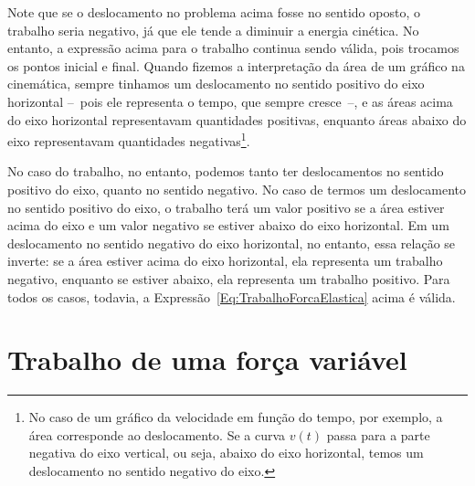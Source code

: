 Note que se o deslocamento no problema acima fosse no sentido oposto, o trabalho seria negativo, já que ele tende a diminuir a energia cinética. No entanto, a expressão acima para o trabalho continua sendo válida, pois trocamos os pontos inicial e final. Quando fizemos a interpretação da área de um gráfico na cinemática, sempre tinhamos um deslocamento no sentido positivo do eixo horizontal --~pois ele representa o tempo, que sempre cresce~--, e as áreas acima do eixo horizontal representavam quantidades positivas, enquanto áreas abaixo do eixo representavam quantidades negativas\footnote{No caso de um gráfico da velocidade em função do tempo, por exemplo, a área corresponde ao deslocamento. Se a curva $v(t)$ passa para a parte negativa do eixo vertical, ou seja, abaixo do eixo horizontal, temos um deslocamento no sentido negativo do eixo.}.

No caso do trabalho, no entanto, podemos tanto ter deslocamentos no sentido positivo do eixo, quanto no sentido negativo. No caso de termos um deslocamento no sentido positivo do eixo, o trabalho terá um valor positivo se a área estiver acima do eixo e um valor negativo se estiver abaixo do eixo horizontal. Em um deslocamento no sentido negativo do eixo horizontal, no entanto, essa relação se inverte: se a área estiver acima do eixo horizontal, ela representa um trabalho negativo, enquanto se estiver abaixo, ela representa um trabalho positivo. Para todos os casos, todavia, a Expressão~\eqref{Eq:TrabalhoForcaElastica} acima é válida.

\section{Trabalho de uma força variável}

